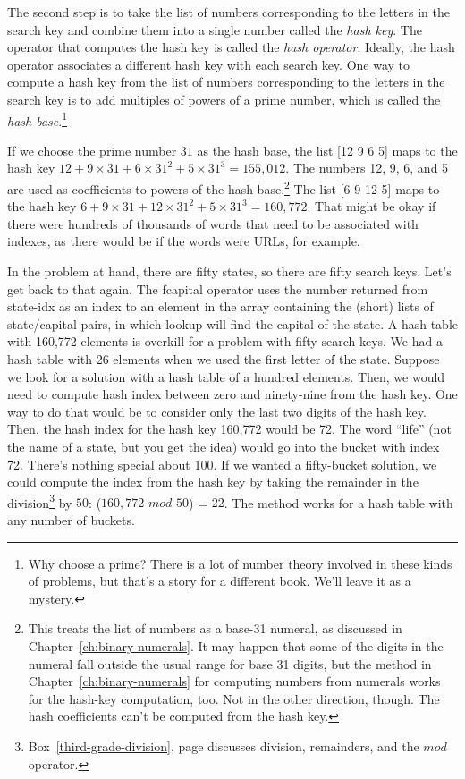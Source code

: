 The second step is to take the list of numbers corresponding
to the letters in the search key
and combine them into a single number called
the \emph{hash key}.
The operator that computes the hash key is called
the \emph{hash operator}.
Ideally, the hash operator associates a different hash key
with each search key.
One way to compute a hash key from the list of numbers
corresponding to the letters in the search key is
to add multiples of powers of a
prime number, which is called the
\emph{hash base}.\footnote{Why choose a prime?
There is a lot of number theory involved in these kinds
of problems, but that's a story for a different book.
We'll leave it as a mystery.}

If we choose the prime number $31$
as the hash base, the list \textsf{[12 9 6 5]} maps to the hash key
$12 + 9\times31 + 6\times31^2 + 5\times31^3 = 155,012$.
The numbers 12, 9, 6, and 5 are used as coefficients to powers of
the hash base.\footnote{This treats the
list of numbers as a base-31 numeral, as
discussed in Chapter~\ref{ch:binary-numerals}.
It may happen that some of the digits in the numeral
fall outside the usual range for base 31 digits,
but the method in Chapter~\ref{ch:binary-numerals}
for computing numbers from numerals works
for the hash-key computation, too. Not in the other direction, though.
The hash coefficients can't be computed from the hash key.}
The list \textsf{[6 9 12 5]} maps to the hash key
$6 + 9\times31 + 12\times31^2 + 5\times31^3 = 160,772$.
That might be okay if there were hundreds of thousands of words
that need to be associated with indexes, as there would be
if the words were URLs, for example.

In the problem at hand, there are fifty states,
so there are fifty search keys.
Let's get back to that again.
The \textsf{fcapital} operator uses the
number returned from \textsf{state-idx} as an index to
an element in the array containing the (short) lists of
state/capital pairs, in which
\textsf{lookup} will find the capital of the state.
A hash table with 160,772 elements is overkill for
a problem with fifty search keys.
We had a hash table with 26 elements when we used the first letter of the state.
Suppose we look for a solution with a hash table of a hundred elements.
Then, we would need to compute hash index between zero and ninety-nine
from the hash key. One way to do that would be to
consider only the last two digits of the hash key.
Then, the hash index for the hash key 160,772 would be 72.
The word ``life'' (not the name of a state, but you get the idea)
would go into the bucket
with index 72.
There's nothing special about 100.
If we wanted a fifty-bucket solution,
we could compute the index from the hash key by taking the
remainder in the division\footnote{Box~\ref{third-grade-division},
page \pageref{third-grade-division} discusses
division, remainders, and the $mod$ operator.}
by  $50$: ($160,772$ $mod$ $50$) = $22$.
The method works for a hash table with any number of buckets.

